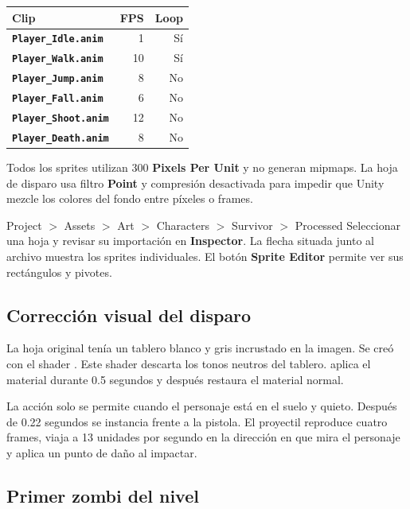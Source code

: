 \documentclass[11pt,a4paper]{article}
\begin{document}
\begin{tabularx}{\textwidth}{>{\bfseries}X r r}
\toprule
Clip & FPS & Loop \\
\midrule
\texttt{Player\_Idle.anim} & 1 & Sí \\
\texttt{Player\_Walk.anim} & 10 & Sí \\
\texttt{Player\_Jump.anim} & 8 & No \\
\texttt{Player\_Fall.anim} & 6 & No \\
\texttt{Player\_Shoot.anim} & 12 & No \\
\texttt{Player\_Death.anim} & 8 & No \\
\bottomrule
\end{tabularx}

Todos los sprites utilizan 300 \textbf{Pixels Per Unit} y no generan mipmaps. La hoja de disparo usa filtro \textbf{Point} y compresión desactivada para impedir que Unity mezcle los colores del fondo entre píxeles o frames.

\begin{unitybox}{Project $>$ Assets $>$ Art $>$ Characters $>$ Survivor $>$ Processed}
Seleccionar una hoja y revisar su importación en \textbf{Inspector}. La flecha situada junto al archivo muestra los sprites individuales. El botón \textbf{Sprite Editor} permite ver sus rectángulos y pivotes.
\end{unitybox}

\subsection{Corrección visual del disparo}

La hoja original tenía un tablero blanco y gris incrustado en la imagen. Se creó  con el shader . Este shader descarta los tonos neutros del tablero.  aplica el material durante 0.5 segundos y después restaura el material normal.

La acción solo se permite cuando el personaje está en el suelo y quieto. Después de 0.22 segundos se instancia  frente a la pistola. El proyectil reproduce cuatro frames, viaja a 13 unidades por segundo en la dirección en que mira el personaje y aplica un punto de daño al impactar.

\subsection{Primer zombi del nivel}
\end{document}
